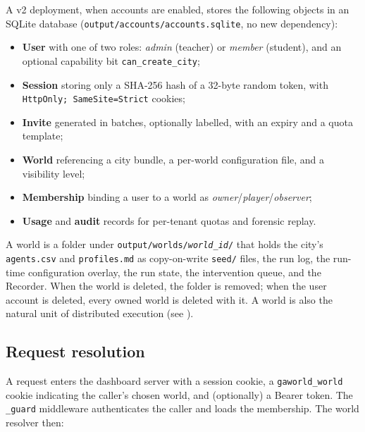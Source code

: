 A v2 deployment, when accounts are enabled, stores the following objects in
an SQLite database (\texttt{output/accounts/accounts.sqlite}, no new
dependency):

\begin{itemize}[leftmargin=*]
  \item \textbf{User} with one of two roles: \emph{admin} (teacher) or
  \emph{member} (student), and an optional capability bit
  \texttt{can\_create\_city};
  \item \textbf{Session} storing only a SHA-256 hash of a 32-byte random
  token, with \texttt{HttpOnly; SameSite=Strict} cookies;
  \item \textbf{Invite} generated in batches, optionally labelled, with an
  expiry and a quota template;
  \item \textbf{World} referencing a city bundle, a per-world configuration
  file, and a visibility level;
  \item \textbf{Membership} binding a user to a world as
  \emph{owner}/\emph{player}/\emph{observer};
  \item \textbf{Usage} and \textbf{audit} records for per-tenant quotas and
  forensic replay.
\end{itemize}

A world is a folder under \texttt{output/worlds/\textit{world\_id}/} that
holds the city's \texttt{agents.csv} and \texttt{profiles.md} as
copy-on-write \texttt{seed/} files, the run log, the run-time
configuration overlay, the run state, the intervention queue, and the
Recorder.  When the world is deleted, the folder is removed; when the user
account is deleted, every owned world is deleted with it.  A world is also
the natural unit of distributed execution (see
).

\subsection{Request resolution}

A request enters the dashboard server with a session cookie, a
\texttt{gaworld\_world} cookie indicating the caller's chosen world, and
(optionally) a Bearer token.  The \texttt{\_guard} middleware authenticates
the caller and loads the membership.  The world resolver then:

